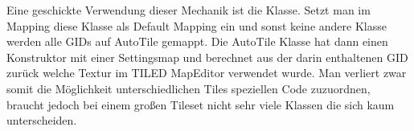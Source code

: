 Eine geschickte Verwendung dieser Mechanik ist die  Klasse. Setzt man im Mapping diese Klasse als Default Mapping ein und sonst keine andere Klasse werden alle GIDs auf AutoTile gemappt. Die AutoTile Klasse hat dann einen Konstruktor mit einer Settingsmap und berechnet aus der darin enthaltenen GID zurück welche Textur im TILED MapEditor verwendet wurde. Man verliert zwar somit die Möglichkeit unterschiedlichen Tiles speziellen Code zuzuordnen, braucht jedoch bei einem großen Tileset nicht sehr viele Klassen die sich kaum unterscheiden. %